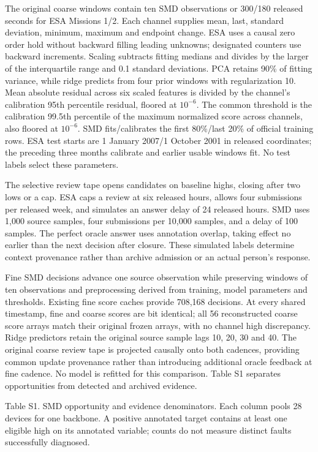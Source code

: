 \documentclass[11pt]{article}
\begin{document}
The original coarse windows contain ten SMD observations or 300/180 released seconds for ESA Missions 1/2. Each channel supplies mean, last, standard deviation, minimum, maximum and endpoint change. ESA uses a causal zero order hold without backward filling leading unknowns; designated counters use backward increments. Scaling subtracts fitting medians and divides by the larger of the interquartile range and 0.1 standard deviations. PCA retains 90\% of fitting variance, while ridge predicts from four prior windows with regularization 10. Mean absolute residual across six scaled features is divided by the channel’s calibration 95th percentile residual, floored at $10^{-6}$. The common threshold is the calibration 99.5th percentile of the maximum normalized score across channels, also floored at $10^{-6}$. SMD fits/calibrates the first 80\%/last 20\% of official training rows. ESA test starts are 1 January 2007/1 October 2001 in released coordinates; the preceding three months calibrate and earlier usable windows fit. No test labels select these parameters.

The selective review tape opens candidates on baseline highs, closing after two lows or a cap. ESA caps a review at six released hours, allows four submissions per released week, and simulates an answer delay of 24 released hours. SMD uses 1,000 source samples, four submissions per 10,000 samples, and a delay of 100 samples. The perfect oracle answer uses annotation overlap, taking effect no earlier than the next decision after closure. These simulated labels determine context provenance rather than archive admission or an actual person’s response.

Fine SMD decisions advance one source observation while preserving windows of ten observations and preprocessing derived from training, model parameters and thresholds. Existing fine score caches provide 708,168 decisions. At every shared timestamp, fine and coarse scores are bit identical; all 56 reconstructed coarse score arrays match their original frozen arrays, with no channel high discrepancy. Ridge predictors retain the original source sample lags 10, 20, 30 and 40. The original coarse review tape is projected causally onto both cadences, providing common update provenance rather than introducing additional oracle feedback at fine cadence. No model is refitted for this comparison. Table S1 separates opportunities from detected and archived evidence.

Table S1. SMD opportunity and evidence denominators. Each column pools 28 devices for one backbone. A positive annotated target contains at least one eligible high on its annotated variable; counts do not measure distinct faults successfully diagnosed.
\end{document}
